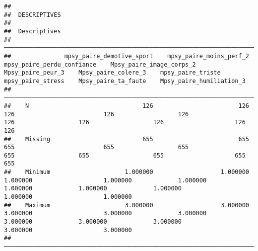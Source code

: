 \documentclass[
]{article}
\begin{document}
\begin{verbatim}
## 
##  DESCRIPTIVES
## 
##  Descriptives                                                                                                                                                                                                                                                           
##  ────────────────────────────────────────────────────────────────────────────────────────────────────────────────────────────────────────────────────────────────────────────────────────────────────────────────────────────────────────────────────────────────────── 
##               mpsy_paire_demotive_sport    mpsy_paire_moins_perf_2    mpsy_paire_perdu_confiance    Mpsy_paire_image_corps_2    Mpsy_paire_peur_3    Mpsy_paire_colere_3    mpsy_paire_triste    mpsy_paire_stress    Mpsy_paire_ta_faute    Mpsy_paire_humiliation_3   
##  ────────────────────────────────────────────────────────────────────────────────────────────────────────────────────────────────────────────────────────────────────────────────────────────────────────────────────────────────────────────────────────────────────── 
##    N                                126                        126                           126                         126                  126                    126                  126                  126                    126                         126   
##    Missing                          655                        655                           655                         655                  655                    655                  655                  655                    655                         655   
##    Minimum                     1.000000                   1.000000                      1.000000                    1.000000             1.000000               1.000000             1.000000             1.000000               1.000000                    1.000000   
##    Maximum                     3.000000                   3.000000                      3.000000                    3.000000             3.000000               3.000000             3.000000             3.000000               3.000000                    3.000000   
##  ──────────────────────────────────────────────────────────────────────────────────────────────────────────────────────────────────────────────────────────────────────────────────────────────────────────────────────────────────────────────────────────────────────
\end{verbatim}
\end{document}
